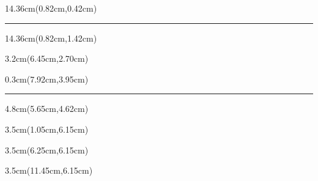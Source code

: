 \begin{frame}[plain]
\begin{textblock*}{14.36cm}(0.82cm,0.42cm)
  \par
  \vspace{0.08cm}
  {\color{SBPrimary}\rule{2.25cm}{1.3pt}}
\end{textblock*}

\begin{textblock*}{14.36cm}(0.82cm,1.42cm)
\end{textblock*}

\begin{textblock*}{3.2cm}(6.45cm,2.70cm)
\end{textblock*}

\begin{textblock*}{0.3cm}(7.92cm,3.95cm)
{\color{SBPrimary}\rule{0.8pt}{0.52cm}}
\end{textblock*}

\begin{textblock*}{4.8cm}(5.65cm,4.62cm)
\end{textblock*}

\begin{textblock*}{3.5cm}(1.05cm,6.15cm)
\end{textblock*}
\begin{textblock*}{3.5cm}(6.25cm,6.15cm)
\end{textblock*}
\begin{textblock*}{3.5cm}(11.45cm,6.15cm)
\end{textblock*}
\SBFixedFooter
\end{frame}
